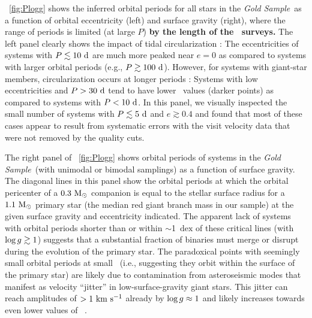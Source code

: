 \documentclass[modern]{aastex63}
\newcommand{\changes}[1]{{\bf\color{purple}#1}}
\newcommand{\goldsample}{\textit{Gold Sample}}
\begin{document}
\figurename~\ref{fig:Plogg} shows the inferred orbital periods for all stars in
the \goldsample\ as a function of orbital eccentricity (left) and surface
gravity (right), where the range of periods is limited (at large $P$)
\changes{by the length of the \apogee\ surveys.}
The left panel clearly shows the impact of tidal circularization
\citep[e.g.,][]{Zahn:1977, Meibom:2005}:
The eccentricities of systems with $P \lesssim 10~\mathrm{d}$ are much more peaked
near $e=0$ as compared to systems with larger orbital periods (e.g., $P\gtrsim
100~\mathrm{d}$).
However, for systems with giant-star members, circularization occurs at longer
periods \citep[e.g.,][]{Price-Whelan:2018a}: Systems with low eccentricities and
$P>30~\mathrm{d}$ tend to have lower \logg\ values (darker points) as compared to
systems with $P<10~\mathrm{d}$.
In this panel, we visually inspected the small number of systems with $P\lesssim
5~\mathrm{d}$ and $e \gtrsim 0.4$ and found that most of these cases appear to result
from systematic errors with the visit velocity data that were not removed by the
quality cuts.

The right panel of \figurename~\ref{fig:Plogg} shows orbital periods of systems
in the \goldsample\ (with unimodal or bimodal samplings) as a function of
surface gravity.
The diagonal lines in this panel show the orbital periods at which the orbital
pericenter of a $0.3~\mathrm{M}_\odot$ companion is equal to the stellar surface radius for
a $1.1~\mathrm{M}_\odot$ primary star (the median red giant branch mass in our sample) at
the given surface gravity and eccentricity indicated.
The apparent lack of systems with orbital periods shorter than or within
$\sim$1~$\mathrm{dex}$ of these critical lines (with $\log g \gtrsim 1$) suggests
that a substantial fraction of binaries must merge or disrupt during the
evolution of the primary star.
The paradoxical points with seemingly small orbital periods at small \logg\
(i.e., suggesting they orbit within the surface of the primary star) are likely
due to contamination from asteroseismic modes that manifest as velocity
``jitter'' in low-surface-gravity giant stars.
This jitter can reach amplitudes of $>1~\mathrm{km}~\mathrm{s}^{-1}$ already by $\log g \approx 1$ and
likely increases towards even lower values of \logg\
\citep[e.g.,][]{Hekker:2008}.
\end{document}
